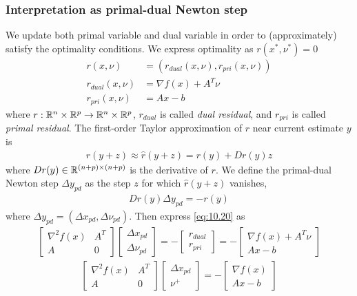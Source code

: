 \subsubsection{Interpretation as primal-dual Newton step}
We update both primal variable and dual variable in order to (approximately) satisfy the optimality conditions.
We express optimality as $r(x^\ast,\nu^\ast)=0$
\begin{align*}
  r(x,\nu)&=(r_{dual}(x,\nu),r_{pri}(x,\nu))\\
  r_{dual}(x,\nu)&=\nabla f(x)+A^T\nu\\
  r_{pri}(x,\nu)&=Ax-b
\end{align*}
where $r:\mathbb{R}^n\times\mathbb{R}^p\rightarrow\mathbb{R}^n\times\mathbb{R}^p$, $r_{dual}$ is called \textit{dual residual}, and $r_{pri}$ is called \textit{primal residual}.
The first-order Taylor approximation of $r$ near current estimate $y$ is
\begin{align*}
  r(y+z)\approx\hat{r}(y+z)=r(y)+Dr(y)z
\end{align*}
where $Dr(y)\in\mathbb{R}^{(n+p)\times(n+p)}$ is the derivative of $r$.
We define the primal-dual Newton step $\Delta y_{pd}$ as the step $z$ for which $\hat{r}(y+z)$ vanishes, \ie
\begin{align}
  Dr(y)\Delta y_{pd}=-r(y)\label{eq:10.20}
\end{align}
where $\Delta y_{pd}=(\Delta x_{pd},\Delta \nu_{pd})$. Then express \eqref{eq:10.20} as
\begin{align}
  \begin{bmatrix}
    \nabla^2f(x)&A^T\\A&0
  \end{bmatrix}
  \begin{bmatrix}
    \Delta x_{pd}\\\Delta\nu_{pd}
  \end{bmatrix}=-
  \begin{bmatrix}
    r_{dual}\\r_{pri}
  \end{bmatrix}=-
  \begin{bmatrix}
    \nabla f(x)+A^T\nu\\Ax-b
  \end{bmatrix}\label{eq:10.21}
\end{align}
\ie
\begin{align}
  \begin{bmatrix}
    \nabla^2f(x)&A^T\\A&0
  \end{bmatrix}
  \begin{bmatrix}
    \Delta x_{pd}\\\nu^+
  \end{bmatrix}=-
  \begin{bmatrix}
    \nabla f(x)\\Ax-b
  \end{bmatrix}\label{eq:10.22}
\end{align}
